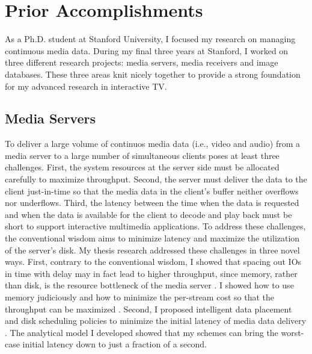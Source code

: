 \section{Prior Accomplishments}

As a Ph.D. student at Stanford University, I focused my research
on managing continuous media data.
During my final three years at Stanford, I 
worked on three different
research projects: media servers, media receivers and image databases.
These three areas 
knit nicely together to provide a strong foundation 
for my advanced research in interactive TV.

\subsection{Media Servers}

To deliver a large volume of continuos media data
(i.e., video and audio) from a media
server to a large number of simultaneous clients poses at least
three challenges. First, the system resources
at the server side must be allocated 
carefully to maximize throughput. Second,
the server must deliver the data to the client just-in-time so
that the media data in the client's buffer neither overflows
nor underflows. Third, the latency between the time when the
data is requested and when the data is available for the client
to decode and play back must be short to support interactive
multimedia applications.  To address these challenges, the
conventional wisdom aims to minimize latency and maximize the
utilization of the server's disk.  My thesis research
addressed these challenges
in three novel ways. First, contrary to the conventional wisdom,
I showed that spacing out IOs in time with delay may in fact lead to higher
throughput, since memory, rather than disk, is the resource
bottleneck of the media server \cite{ex49}. I showed how to use memory
judiciously and how to minimize the per-stream cost so that
the throughput can be maximized \cite{ex200}.  Second, I proposed intelligent
data placement and disk scheduling policies to minimize the
initial latency of media data delivery \cite{ex80,ex54}. The analytical model
I developed showed that my schemes can bring the worst-case initial latency
down to just a fraction of a second. 

